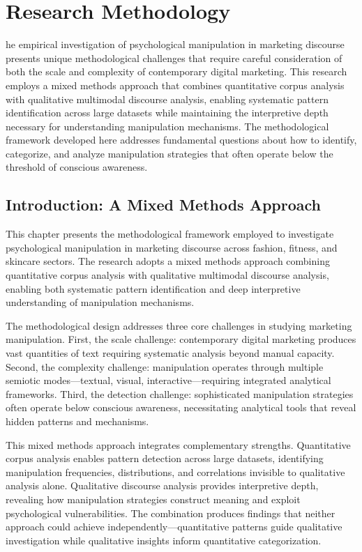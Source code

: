 
\chapter{Research Methodology}
\label{ch:methodology}

he empirical investigation of psychological manipulation in marketing discourse presents unique methodological challenges that require careful consideration of both the scale and complexity of contemporary digital marketing. This research employs a mixed methods approach that combines quantitative corpus analysis with qualitative multimodal discourse analysis, enabling systematic pattern identification across large datasets while maintaining the interpretive depth necessary for understanding manipulation mechanisms. The methodological framework developed here addresses fundamental questions about how to identify, categorize, and analyze manipulation strategies that often operate below the threshold of conscious awareness.

\section{Introduction: A Mixed Methods Approach}
\label{sec:method_intro}

This chapter presents the methodological framework employed to investigate psychological manipulation in marketing discourse across fashion, fitness, and skincare sectors. The research adopts a mixed methods approach combining quantitative corpus analysis with qualitative multimodal discourse analysis, enabling both systematic pattern identification and deep interpretive understanding of manipulation mechanisms.

The methodological design addresses three core challenges in studying marketing manipulation. First, the scale challenge: contemporary digital marketing produces vast quantities of text requiring systematic analysis beyond manual capacity. Second, the complexity challenge: manipulation operates through multiple semiotic modes—textual, visual, interactive—requiring integrated analytical frameworks. Third, the detection challenge: sophisticated manipulation strategies often operate below conscious awareness, necessitating analytical tools that reveal hidden patterns and mechanisms.

This mixed methods approach integrates complementary strengths. Quantitative corpus analysis enables pattern detection across large datasets, identifying manipulation frequencies, distributions, and correlations invisible to qualitative analysis alone. Qualitative discourse analysis provides interpretive depth, revealing how manipulation strategies construct meaning and exploit psychological vulnerabilities. The combination produces findings that neither approach could achieve independently—quantitative patterns guide qualitative investigation while qualitative insights inform quantitative categorization.

